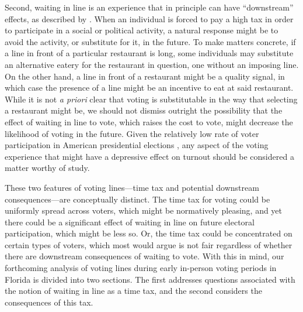 \documentclass[12pt,titlepage]{article}
\begin{document}
Second, waiting in line is an experience that in principle can have
``downstream'' effects, as described by
\citet{pettigrew:longlinesminorityprecincts}. When an individual is
forced to pay a high tax in order to participate in a social or
political activity, a natural response might be to avoid the activity,
or substitute for it, in the future. To make matters concrete, if a
line in front of a particular restaurant is long, some individuals may
substitute an alternative eatery for the restaurant in question, one
without an imposing line.  On the other hand, a line in front of a
restaurant might be a quality signal, in which case the presence of a
line might be an incentive to eat at said restaurant.  While it is not
\emph{a priori} clear that voting is substitutable in the way that
selecting a restaurant might be, we should not dismiss outright the
possibility that the effect of waiting in line to vote, which raises
the cost to vote, might decrease the likelihood of voting in the
future.  Given the relatively low rate of voter participation in
American presidential elections \citep{IDEA:turnout}, any aspect of
the voting experience that might have a depressive effect on turnout
should be considered a matter worthy of study.


These two features of voting lines---time tax and potential downstream
consequences---are conceptually distinct. The time tax for voting
could be uniformly spread across voters, which might be normatively
pleasing, and yet there could be a significant effect of waiting in
line on future electoral participation, which might be less so. Or,
the time tax could be concentrated on certain types of voters, which
most would argue is not fair regardless of whether there are
downstream consequences of waiting to vote. With this in mind, our
forthcoming analysis of voting lines during early in-person voting
periods in Florida is divided into two sections. The first addresses
questions associated with the notion of waiting in line as a time tax,
and the second considers the consequences of this tax.
\end{document}
